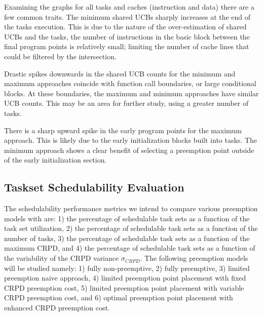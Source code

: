 Examining the graphs for all tasks and caches (instruction and data)
there are a few common traits. The minimum shared UCBs sharply
increases at the end of the tasks execution. This is due to the nature
of the over-estimation of shared UCBs and the tasks, the number of
instructions in the basic block between the final program points is
relatively small; limiting the number of cache lines that could be
filtered by the intersection.

Drastic spikes downwards in the shared UCB counts for the minimum and
maximum approaches coincide with function call boundaries, or large
conditional blocks. At these boundaries, the maximum and minimum
approaches have similar UCB counts. This may be an area for further
study, using a greater number of tasks.

There is a sharp upward spike in the early program points for the
maximum approach. This is likely due to the early initialization
blocks built into tasks. The minimum approach shows a clear benefit of
selecting a preemption point outside of the early initialization
section. 

\subsection {Taskset Schedulability Evaluation}\label{sec:taskset schedulability}
The schedulability performance metrics we intend to compare various
preemption models with are: 1) the percentage of schedulable task sets
as a function of the task set utilization, 2) the percentage of
schedulable task sets as a function of the number of tasks, 3) the
percentage of schedulable task sets as a function of the maximum CRPD,
and 4) the percentage of schedulable task sets as a function of the
variability of the CRPD variance \begin{math}\sigma_{CRPD}\end{math}.
The following preemption models will be studied namely: 1) fully
non-preemptive, 2) fully preemptive, 3) limited preemption naive
approach, 4) limited preemption point placement with fixed CRPD
preemption cost, 5) limited preemption point placement with variable
CRPD preemption cost, and 6) optimal preemption point placement with
enhanced CRPD preemption cost. 


